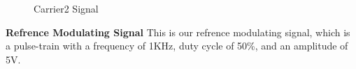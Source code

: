 \documentclass[12pt]{article}
\begin{document}
\begin{figure}[H]
    \centering
    \caption{Carrier2 Signal}
\end{figure}
\textbf{Refrence Modulating Signal}
This is our refrence modulating signal, which is a pulse-train with a frequency of 1KHz, duty cycle of 50\%, and an amplitude of 5V.
\end{document}
